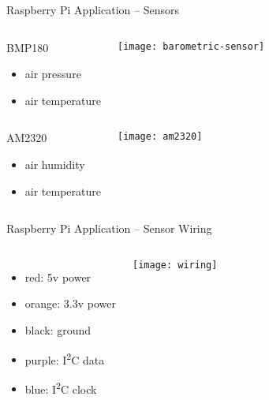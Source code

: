 \begin{frame}{Raspberry Pi Application -- Sensors}
  \begin{columns}
    \begin{block}{BMP180}
      \begin{itemize}
        \item air pressure
        \item air temperature
      \end{itemize}
    \end{block}

    \vfill
    \centering
    \texttt{[image: barometric-sensor]}
  \end{columns}

  \begin{columns}
    \begin{block}{AM2320}
      \begin{itemize}
        \item air humidity
        \item air temperature
      \end{itemize}
    \end{block}

    \vfill
    \centering
    \texttt{[image: am2320]}
  \end{columns}
\end{frame}

\begin{frame}{Raspberry Pi Application -- Sensor Wiring}
  \begin{columns}

    \begin{itemize}
      \item {\color{red}red:} 5v power
      \item {\color{orange}orange:} 3.3v power
      \item {\color{black}black:} ground
      \item {\color{purple}purple:} I\textsuperscript{2}C data
      \item {\color{blue}blue:} I\textsuperscript{2}C clock
    \end{itemize}

    \vspace*{1em}
    \texttt{[image: wiring]}
  \end{columns}
\end{frame}

